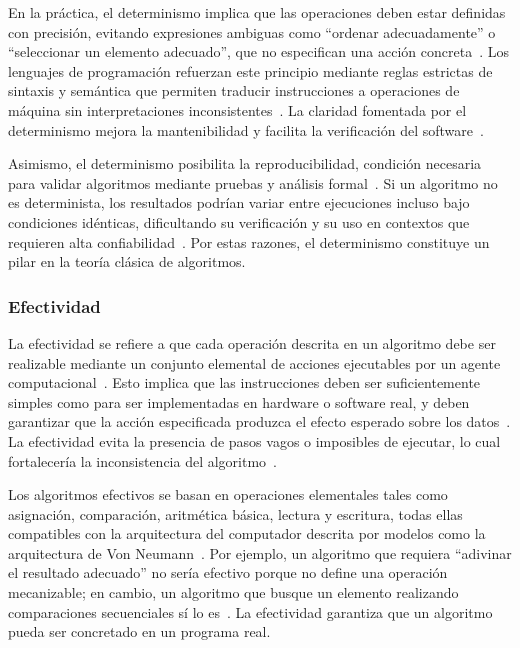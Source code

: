 \documentclass[12pt,twoside]{book}
\begin{document}
					En la práctica, el determinismo implica que las operaciones deben estar definidas con precisión, evitando expresiones ambiguas como “ordenar adecuadamente” o “seleccionar un elemento adecuado”, que no especifican una acción concreta~\cite{Tanenbaum2021Structured}. Los lenguajes de programación refuerzan este principio mediante reglas estrictas de sintaxis y semántica que permiten traducir instrucciones a operaciones de máquina sin interpretaciones inconsistentes~\cite{Gaddis2022Starting}. La claridad fomentada por el determinismo mejora la mantenibilidad y facilita la verificación del software~\cite{Pressman2019Software}.
					
					Asimismo, el determinismo posibilita la reproducibilidad, condición necesaria para validar algoritmos mediante pruebas y análisis formal~\cite{Sommerville2015Software}. Si un algoritmo no es determinista, los resultados podrían variar entre ejecuciones incluso bajo condiciones idénticas, dificultando su verificación y su uso en contextos que requieren alta confiabilidad~\cite{Stallings2021Computer}. Por estas razones, el determinismo constituye un pilar en la teoría clásica de algoritmos.
					
				\subsubsection{Efectividad}
					La efectividad se refiere a que cada operación descrita en un algoritmo debe ser realizable mediante un conjunto elemental de acciones ejecutables por un agente computacional~\cite{Pressman2019Software}. Esto implica que las instrucciones deben ser suficientemente simples como para ser implementadas en hardware o software real, y deben garantizar que la acción especificada produzca el efecto esperado sobre los datos~\cite{Sommerville2015Software}. La efectividad evita la presencia de pasos vagos o imposibles de ejecutar, lo cual fortalecería la inconsistencia del algoritmo~\cite{Stallings2021Computer}.
					
					Los algoritmos efectivos se basan en operaciones elementales tales como asignación, comparación, aritmética básica, lectura y escritura, todas ellas compatibles con la arquitectura del computador descrita por modelos como la arquitectura de Von Neumann~\cite{Tanenbaum2021Structured}. Por ejemplo, un algoritmo que requiera “adivinar el resultado adecuado” no sería efectivo porque no define una operación mecanizable; en cambio, un algoritmo que busque un elemento realizando comparaciones secuenciales sí lo es~\cite{Gaddis2022Starting}. La efectividad garantiza que un algoritmo pueda ser concretado en un programa real.
					
\end{document}
